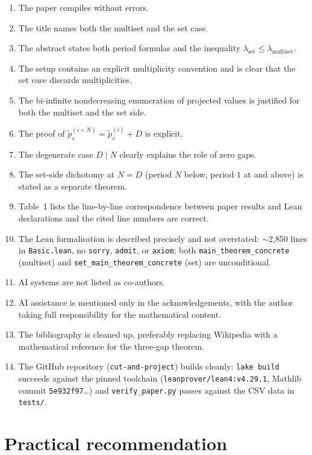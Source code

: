 \documentclass[11pt]{article}
\begin{document}
\begin{enumerate}
    \item The paper compiles without errors.
    \item The title names both the multiset and the set case.
    \item The abstract states both period formulas and the inequality
    \(\lambda_{\mathrm{set}} \le \lambda_{\mathrm{multiset}}\).
    \item The setup contains an explicit multiplicity convention and is
    clear that the set case discards multiplicities.
    \item The bi-infinite nondecreasing enumeration of projected values is
    justified for both the multiset and the set side.
    \item The proof of \(\tilde p_s^{(i+N)}=\tilde p_s^{(i)}+D\) is explicit.
    \item The degenerate case \(D\mid N\) clearly explains the role of zero
    gaps.
    \item The set-side dichotomy at \(N=D\) (period \(N\) below, period
    \(1\) at and above) is stated as a separate theorem.
    \item Table~1 lists the line-by-line correspondence between paper
    results and Lean declarations and the cited line numbers are correct.
    \item The Lean formalisation is described precisely and not overstated:
    \(\sim\)2{,}850 lines in \texttt{Basic.lean}, no \texttt{sorry},
    \texttt{admit}, or \texttt{axiom}; both
    \texttt{main\_theorem\_concrete} (multiset) and
    \texttt{set\_main\_theorem\_concrete} (set) are unconditional.
    \item AI systems are not listed as co-authors.
    \item AI assistance is mentioned only in the acknowledgements, with the
    author taking full responsibility for the mathematical content.
    \item The bibliography is cleaned up, preferably replacing Wikipedia with
    a mathematical reference for the three-gap theorem.
    \item The GitHub repository (\texttt{cut-and-project}) builds cleanly:
    \texttt{lake build} succeeds against the pinned toolchain
    (\texttt{leanprover/lean4:v4.29.1}, Mathlib commit
    \texttt{5e932f97}\dots) and \texttt{verify\_paper.py} passes against
    the CSV data in \texttt{tests/}.
\end{enumerate}

\section*{Practical recommendation}
\end{document}
